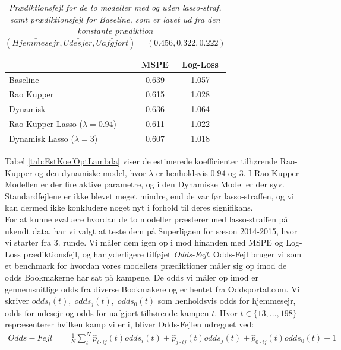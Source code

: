 \documentclass[11pt,a4paper]{article}
\begin{document}
\begin{table}[ht]
\centering
\begin{adjustbox}{max width=\textwidth}
\begin{tabular}{|l|cc|}
\hline 
 & MSPE & Log-Loss  \\
 \hline
Baseline & 0.639 & 1.057 \\
Rao Kupper & 0.615 & 1.028 \\
Dynamisk & 0.636 & 1.064 \\
Rao Kupper Lasso ($\lambda=0.94$)& 0.611 & 1.022 \\
Dynamisk Lasso ($\lambda=3$) & 0.607 & 1.018 \\
   \hline   
\end{tabular} 
\end{adjustbox}
\caption{\label{tab:KVMSPELOGLOSS}\textit{Prædiktionsfejl for de to modeller med og uden lasso-straf, samt prædiktionsfejl for Baseline, som er lavet ud fra den konstante prædiktion $(\bar{Hjemmesejr},\bar{Udesjer}, \bar{Uafgjort}) = (0.456,0.322,0.222)$}}
\end{table}
\newpage
Tabel \ref{tab:EstKoefOptLambda} viser de estimerede koefficienter tilhørende Rao-Kupper og den dynamiske model, hvor $\lambda$ er henholdsvis $0.94$ og $3$. I Rao Kupper Modellen er der fire aktive parametre, og i den Dynamiske Model er der syv. Standardfejlene er ikke blevet meget mindre, end de var før lasso-straffen, og vi kan dermed ikke konkludere noget nyt i forhold til deres signifikans.\\
\newpage
For at kunne evaluere hvordan de to modeller præsterer med lasso-straffen på ukendt data, har vi valgt at teste dem på Superligaen for sæson 2014-2015, hvor vi starter fra 3. runde. Vi måler dem igen op i mod hinanden med MSPE og Log-Loss prædiktionsfejl, og har yderligere tilføjet \textit{Odds-Fejl}. Odds-Fejl bruger vi som et benchmark for hvordan vores modellers prædiktioner måler sig op imod de odds Bookmakerne har sat på kampene. De odds vi måler op imod er gennemsnitlige odds fra diverse Bookmakere og er hentet fra Oddsportal.com. Vi skriver $odds_i(t),\; odds_j(t), \; odds_0(t)$ som henholdsvis odds for hjemmesejr, odds for udesejr og odds for uafgjort tilhørende kampen $t$. Hvor $t \in \{13,...,198 \}$ repræsenterer hvilken kamp vi er i, bliver Odds-Fejlen udregnet ved:\\
\begin{align*}
    Odds-Fejl &= \frac{1}{N}\sum_t^N \hat{p}_{i\cdot ij}(t)odds_i(t)+\hat{p}_{j\cdot ij}(t)odds_j(t)+\hat{p}_{0\cdot ij}(t)odds_0(t) -1
\end{align*}
\end{document}
